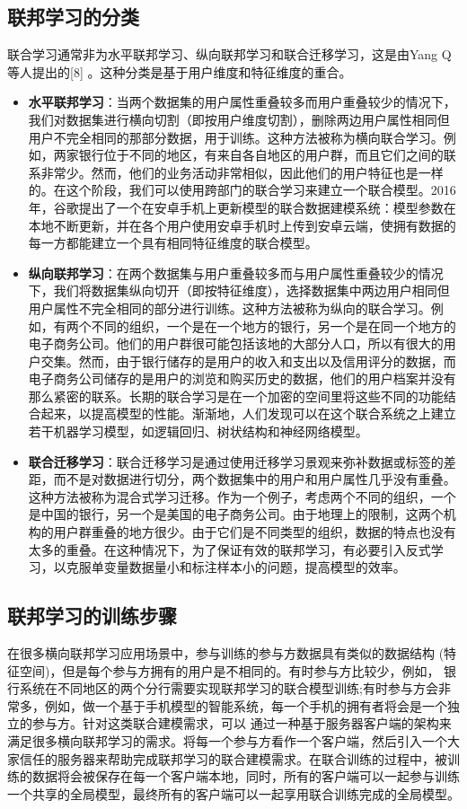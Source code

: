 \subsection{联邦学习的分类}
联合学习通常非为水平联邦学习、纵向联邦学习和联合迁移学习，这是由Yang Q等人提出的[8] 。这种分类是基于用户维度和特征维度的重合。
\begin{itemize}
\item \textbf{水平联邦学习}：当两个数据集的用户属性重叠较多而用户重叠较少的情况下，我们对数据集进行横向切割（即按用户维度切割），删除两边用户属性相同但用户不完全相同的那部分数据，用于训练。这种方法被称为横向联合学习。例如，两家银行位于不同的地区，有来自各自地区的用户群，而且它们之间的联系非常少。然而，他们的业务活动非常相似，因此他们的用户特征也是一样的。在这个阶段，我们可以使用跨部门的联合学习来建立一个联合模型。2016年，谷歌提出了一个在安卓手机上更新模型的联合数据建模系统：模型参数在本地不断更新，并在各个用户使用安卓手机时上传到安卓云端，使拥有数据的每一方都能建立一个具有相同特征维度的联合模型。

\item \textbf{纵向联邦学习}：在两个数据集与用户重叠较多而与用户属性重叠较少的情况下，我们将数据集纵向切开（即按特征维度），选择数据集中两边用户相同但用户属性不完全相同的部分进行训练。这种方法被称为纵向的联合学习。例如，有两个不同的组织，一个是在一个地方的银行，另一个是在同一个地方的电子商务公司。他们的用户群很可能包括该地的大部分人口，所以有很大的用户交集。然而，由于银行储存的是用户的收入和支出以及信用评分的数据，而电子商务公司储存的是用户的浏览和购买历史的数据，他们的用户档案并没有那么紧密的联系。长期的联合学习是在一个加密的空间里将这些不同的功能结合起来，以提高模型的性能。渐渐地，人们发现可以在这个联合系统之上建立若干机器学习模型，如逻辑回归、树状结构和神经网络模型。

\item \textbf{联合迁移学习}：联合迁移学习是通过使用迁移学习景观来弥补数据或标签的差距，而不是对数据进行切分，两个数据集中的用户和用户属性几乎没有重叠。这种方法被称为混合式学习迁移。作为一个例子，考虑两个不同的组织，一个是中国的银行，另一个是美国的电子商务公司。由于地理上的限制，这两个机构的用户群重叠的地方很少。由于它们是不同类型的组织，数据的特点也没有太多的重叠。在这种情况下，为了保证有效的联邦学习，有必要引入反式学习，以克服单变量数据量小和标注样本小的问题，提高模型的效率。

\end{itemize}

\subsection{联邦学习的训练步骤}
在很多横向联邦学习应用场景中，参与训练的参与方数据具有类似的数据结构 (特征空间)，但是每个参与方拥有的用户是不相同的。有时参与方比较少，例如， 银行系统在不同地区的两个分行需要实现联邦学习的联合模型训练;有时参与方会非常多，例如，做一个基于手机模型的智能系统，每一个手机的拥有者将会是一个独立的参与方。针对这类联合建模需求，可以 通过一种基于服务器客户端的架构来满足很多横向联邦学习的需求。将每一个参与方看作一个客户端，然后引入一个大家信任的服务器来帮助完成联邦学习的联合建模需求。在联合训练的过程中，被训练的数据将会被保存在每一个客户端本地，同时，所有的客户端可以一起参与训练一个共享的全局模型，最终所有的客户端可以一起享用联合训练完成的全局模型。


